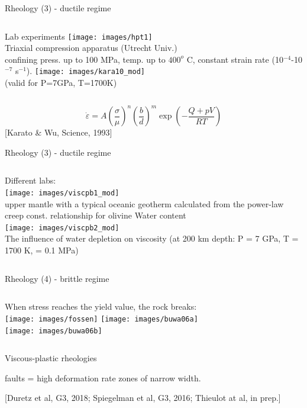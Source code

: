 \documentclass[handout]{beamer}
\begin{document}
\begin{frame}[plain]{Rheology (3) - ductile regime}

\begin{columns}[onlytextwidth]
Lab experiments
\texttt{[image: images/hpt1]}\\
{\tiny Triaxial compression apparatus (Utrecht Univ.)\\
confining press. up to 100 MPa, 
temp. up to $400^o$ C, constant strain rate (10$^{-4}$-10$^{-7}$ s$^{-1}$).} 
\pause
{}
\texttt{[image: images/kara10\_mod]}\\
{\tiny (valid for P=7GPa, T=1700K)}\\
\end{columns}

\vspace{.4cm}
\[
\dot\varepsilon = A \left(\frac{\sigma}{\mu}\right)^n \left(\frac{b}{d}\right)^m \exp\left( -\frac{Q+pV}{RT} \right)
\]
{\tiny [Karato \& Wu, Science, 1993]}

\end{frame}

\begin{frame}[plain]{Rheology (3) - ductile regime}

\begin{columns}[onlytextwidth]
Different labs:\\
\texttt{[image: images/viscpb1\_mod]}\\
{\tiny upper mantle with a typical oceanic
geotherm calculated from the power-law creep const. relationship for olivine}
Water content\\
\texttt{[image: images/viscpb2\_mod]}\\
{\tiny The influence of water depletion on viscosity (at 200 km depth: P = 7 GPa,
T = 1700 K, = 0.1 MPa)}
\end{columns}

\end{frame}

\begin{frame}[plain]{Rheology (4) - brittle regime}

\begin{columns}[onlytextwidth]
When stress reaches the yield value, the rock breaks:\\
\texttt{[image: images/fossen]}
\pause
{}
\texttt{[image: images/buwa06a]}\\
\texttt{[image: images/buwa06b]}
\end{columns}

Viscous-plastic rheologies

faults = high deformation rate zones of narrow width. 

 {\tiny [Duretz et al, G3, 2018; Spiegelman et al, G3, 2016; Thieulot at al, in prep.]} 

\end{frame}
\end{document}
